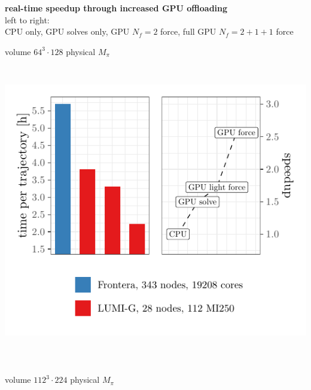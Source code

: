 \documentclass[a0,portrait]{a0poster}
\begin{document}
\begin{multicols}{2}
    \begin{center}
      \textbf{real-time speedup through increased GPU offloading}\\
      left to right:\\
      CPU only, GPU solves only, GPU $N_f=2$ force, full GPU $N_f=2+1+1$ force
    \end{center}
    \vspace{0.5cm}
    \begin{minipage}{0.5\linewidth}
      \centering
      volume $64^3 \cdot 128$ \@ physical $M_\pi$
      \includegraphics[height=13.5cm,page=2]{data/tmLQCD_performance/quda_speedup}\\
    \end{minipage}
    \begin{minipage}{0.5\linewidth}
      \centering
      volume $112^3 \cdot 224$ \@ physical $M_\pi$

\end{minipage}
\end{multicols}
\end{document}
